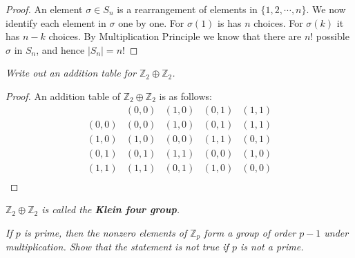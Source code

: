 \begin{proof}
An element $\sigma\in S_n$ is a rearrangement of elements in $\{1,2,\cdots,n\}$. We now identify each element in $\sigma$ one by one. For $\sigma(1)$ is has $n$ choices. For $\sigma(k)$ it has $n-k$ choices. By Multiplication Principle we know that there are $n!$ possible $\sigma$ in $S_n$, and hence $|S_n|=n!$
\end{proof}
\begin{problem}\em
Write out an addition table for $\mathbb{Z}_2\oplus\mathbb{Z}_2$.
\end{problem}
\begin{proof}
An addition table of $\mathbb{Z}_2\oplus\mathbb{Z}_2$ is as follows:
$$
\begin{array}{c|cccc}&(0,0)&(1,0)&(0,1)&(1,1)\\ \hline(0,0)&(0,0)&(1,0)&(0,1)&(1,1)\\ (1,0)&(1,0)&(0,0)&(1,1)&(0,1)\\ (0,1)&(0,1)&(1,1)&(0,0)&(1,0)\\ (1,1)&(1,1)&(0,1)&(1,0)&(0,0)\\ \end{array}
$$
\end{proof}
\begin{note}\em
$\mathbb{Z}_2\oplus\mathbb{Z}_2$ is called the \textbf{Klein four group}.
\end{note}
\begin{problem}\em
If $p$ is prime, then the nonzero elements of $\mathbb{Z}_p$ form a group of order $p-1$ under multiplication. Show that the statement is not true if $p$ is not a prime.
\end{problem}
